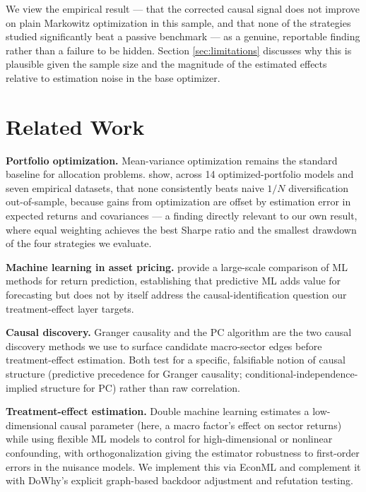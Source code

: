 \documentclass[10pt,twocolumn]{article}
\begin{document}
We view the empirical result --- that the corrected causal signal does not
improve on plain Markowitz optimization in this sample, and that none of
the strategies studied significantly beat a passive benchmark --- as a
genuine, reportable finding rather than a failure to be hidden. Section
\ref{sec:limitations} discusses why this is plausible given the sample
size and the magnitude of the estimated effects relative to estimation
noise in the base optimizer.

\section{Related Work}

\textbf{Portfolio optimization.} Mean-variance optimization
\citep{markowitz1952portfolio} remains the standard baseline for
allocation problems. \citet{demiguel2009optimal} show, across 14
optimized-portfolio models and seven empirical datasets, that none
consistently beats naive $1/N$ diversification out-of-sample, because
gains from optimization are offset by estimation error in expected
returns and covariances --- a finding directly relevant to our own
result, where equal weighting achieves the best Sharpe ratio and the
smallest drawdown of the four strategies we evaluate.

\textbf{Machine learning in asset pricing.} \citet{gu2020empirical}
provide a large-scale comparison of ML methods for return prediction,
establishing that predictive ML adds value for forecasting but does not
by itself address the causal-identification question our treatment-effect
layer targets.

\textbf{Causal discovery.} Granger causality \citep{granger1969investigating}
and the PC algorithm \citep{spirtes2000causation} are the two causal
discovery methods we use to surface candidate macro-sector edges before
treatment-effect estimation. Both test for a specific, falsifiable
notion of causal structure (predictive precedence for Granger causality;
conditional-independence-implied structure for PC) rather than raw
correlation.

\textbf{Treatment-effect estimation.} Double machine learning
\citep{chernozhukov2018double} estimates a low-dimensional causal
parameter (here, a macro factor's effect on sector returns) while using
flexible ML models to control for high-dimensional or nonlinear
confounding, with orthogonalization giving the estimator robustness to
first-order errors in the nuisance models. We implement this via
EconML \citep{battocchi2019econml} and complement it with DoWhy's
\citep{sharma2020dowhy} explicit graph-based backdoor adjustment and
refutation testing.
\end{document}

